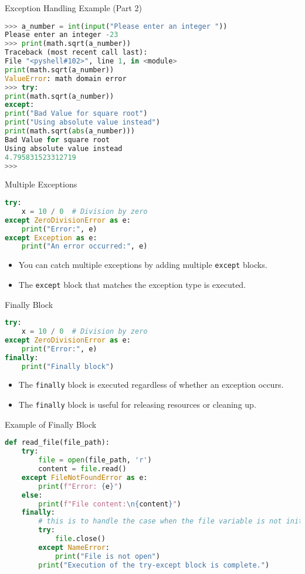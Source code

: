 \begin{frame}[fragile]{Exception Handling Example (Part 2)}
    \begin{lstlisting}[style=colorful, language=Python]
>>> a_number = int(input("Please enter an integer "))
Please enter an integer -23
>>> print(math.sqrt(a_number))
Traceback (most recent call last):
File "<pyshell#102>", line 1, in <module>
print(math.sqrt(a_number))
ValueError: math domain error
>>> try:
print(math.sqrt(a_number))
except:
print("Bad Value for square root")
print("Using absolute value instead")
print(math.sqrt(abs(a_number)))
Bad Value for square root
Using absolute value instead
4.795831523312719
>>>
 \end{lstlisting}
\end{frame}




\begin{frame}[fragile]{Multiple Exceptions}
    \begin{lstlisting}[style=colorful, language=Python]
try:
    x = 10 / 0  # Division by zero
except ZeroDivisionError as e:
    print("Error:", e)
except Exception as e:
    print("An error occurred:", e)
    \end{lstlisting}
    \begin{itemize}
        \item You can catch multiple exceptions by adding multiple \texttt{except} blocks.
        \item The \texttt{except} block that matches the exception type is executed.
    \end{itemize}
\end{frame} 

\begin{frame}[fragile]{Finally Block}
    \begin{lstlisting}[style=colorful, language=Python]
try:
    x = 10 / 0  # Division by zero
except ZeroDivisionError as e:
    print("Error:", e)
finally:
    print("Finally block")
    \end{lstlisting}
    \begin{itemize}
        \item The \texttt{finally} block is executed regardless of whether an exception occurs.
        \item The \texttt{finally} block is useful for releasing resources or cleaning up.
    \end{itemize}
\end{frame}     


\begin{frame}[fragile]{Example of Finally Block}
    \begin{lstlisting}[style=colorful, language=Python]
def read_file(file_path):
    try:
        file = open(file_path, 'r')
        content = file.read()
    except FileNotFoundError as e:
        print(f"Error: {e}")
    else:
        print(f"File content:\n{content}")
    finally:
        # this is to handle the case when the file variable is not initialized
        try:
            file.close()
        except NameError:
            print("File is not open")
        print("Execution of the try-except block is complete.")
    \end{lstlisting}
\end{frame}

